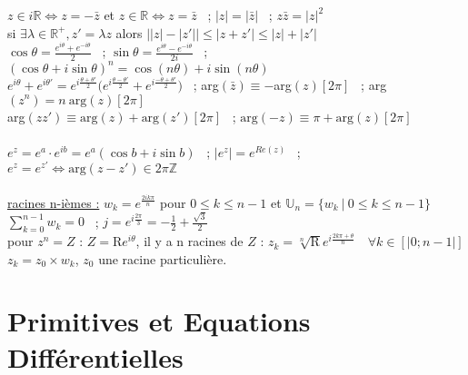 \documentclass[12 pt]{exampleclass}
\begin{document}
\begin{flushleft}
\begin{doublespace}

	$z\in i\mathbb{R} \Leftrightarrow z=-\bar{z}$ et $z\in \mathbb{R} \Leftrightarrow z=\bar{z}$ \ ; $|z|=|\bar{z}|$ \ ; $z\bar{z}=|z|^2$ \\
	si $\exists \lambda \in \mathbb{R}^{+}, z'=\lambda z$ alors $\Big| |z| - |z'| \Big| \leq |z+z'| \leq |z| + |z'|$ \\
	$\cos \theta = \frac{e^{i \theta} + e^{-i \theta}}{2}$ \ ; $\sin \theta = \frac{e^{i \theta} - e^{-i \theta}}{2 i}$ \ ; $(\cos \theta + i \sin \theta)^n = \cos(n \theta)+i\sin(n \theta)$ \\
	$e^{i\theta} + e^{i\theta'} = e^{i\frac{\theta +\theta'}{2}} \Big( e^{i \frac{\theta - \theta'}{2}} + e^{i \frac{-\theta + \theta'}{2}} \Big)$ \ ;  arg$(\bar{z})\equiv- $arg$(z) [2\pi]$ \ ; arg$(z^n) = n \ \text{arg}(z) [2 \pi]$\\
	arg$(zz') \equiv \text{arg}(z) + \text{arg}(z') [2\pi]$ \ ; $\text{arg}(-z) \equiv \pi + \text{arg}(z) [2\pi]$\\
	\text{ } \\
	$e^z = e^a \cdot e^{ib} = e^a(\cos b + i \sin b)$ \ ; $|e^z|=e^{Re(z)} $ \ ; $ e^z=e^{z'} \Leftrightarrow \text{arg}(z-z') \in 2\pi \mathbb{Z} $ \\
	\text{ } \\
	\underline{racines n-ièmes :} $w_k =e^{\frac{2i k\pi}{n}}$ pour $0\leq k \leq n-1$ et $\mathbb{U}_n = \{w_k \ | \ 0 \leq k \leq n-1\} $ \\
	$\sum\limits_{k=0}^{n-1} w_k = 0$ \ ; $ j=e^{i \frac{2 \pi}{3}} = - \frac{1}{2} + \frac{\sqrt{3}}{2}$ \\
	pour $z^n=Z$ : $Z=\text{R} e^{i\theta}$, il y a n racines de $Z$ : $z_k= \sqrt[n]{\text{R}} e^{i\frac{2k\pi + \theta}{n}} \quad \forall k \in [| 0;n-1|]$ \\
	$z_k = z_0 \times w_k$, $z_0$ une racine particulière.\\
\end{doublespace}
\end{flushleft}

\newpage
\section{Primitives et Equations Différentielles}
\end{document}
